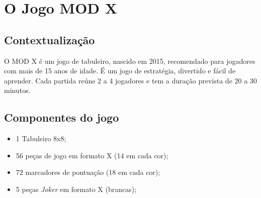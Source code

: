 \documentclass[a4paper]{article}
\begin{document}
%
%
%
%
%
%
%


\section{O Jogo MOD X}

\subsection{Contextualização}
O MOD X é um jogo de tabuleiro, nascido em 2015, recomendado para jogadores com mais de 15 anos de idade.
É um jogo de estratégia, divertido e fácil de aprender.
Cada partida reúne 2 a 4 jogadores e tem a duração prevista de 20 a 30 minutos. 

\subsection{Componentes do jogo}
\begin{itemize}
	\item 1 Tabuleiro 8x8;
	\item 56 peças de jogo em formato X (14 em cada cor);
	\item 72 marcadores de pontuação (18 em cada cor);
	\item 5 peças \textit{Joker} em formato X (brancas);
\end{itemize}
\end{document}
